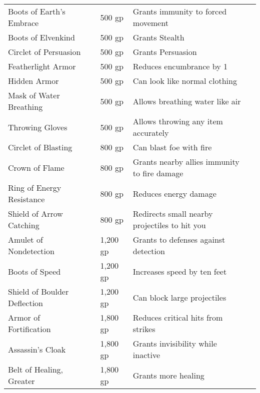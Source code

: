 \begin{longtabuwrapper}
\begin{longtabu}{l l l X l}
Boots of Earth's Embrace &  & 500 gp & Grants immunity to forced movement & \pageref{item:Boots of Earth's Embrace} \\
Boots of Elvenkind &  & 500 gp & Grants  Stealth & \pageref{item:Boots of Elvenkind} \\
Circlet of Persuasion &  & 500 gp & Grants  Persuasion & \pageref{item:Circlet of Persuasion} \\
Featherlight Armor &  & 500 gp & Reduces encumbrance by 1 & \pageref{item:Featherlight Armor} \\
Hidden Armor &  & 500 gp & Can look like normal clothing & \pageref{item:Hidden Armor} \\
Mask of Water Breathing &  & 500 gp & Allows breathing water like air & \pageref{item:Mask of Water Breathing} \\
Throwing Gloves &  & 500 gp & Allows throwing any item accurately & \pageref{item:Throwing Gloves} \\
Circlet of Blasting &  & 800 gp & Can blast foe with fire & \pageref{item:Circlet of Blasting} \\
Crown of Flame &  & 800 gp & Grants nearby allies immunity to fire damage & \pageref{item:Crown of Flame} \\
Ring of Energy Resistance &  & 800 gp & Reduces energy damage & \pageref{item:Ring of Energy Resistance} \\
Shield of Arrow Catching &  & 800 gp & Redirects small nearby projectiles to hit you & \pageref{item:Shield of Arrow Catching} \\
Amulet of Nondetection &  & 1,200 gp & Grants  to defenses against detection & \pageref{item:Amulet of Nondetection} \\
Boots of Speed &  & 1,200 gp & Increases speed by ten feet & \pageref{item:Boots of Speed} \\
Shield of Boulder Deflection &  & 1,200 gp & Can block large projectiles & \pageref{item:Shield of Boulder Deflection} \\
Armor of Fortification &  & 1,800 gp & Reduces critical hits from strikes & \pageref{item:Armor of Fortification} \\
Assassin's Cloak &  & 1,800 gp & Grants invisibility while inactive & \pageref{item:Assassin's Cloak} \\
Belt of Healing, Greater &  & 1,800 gp & Grants more healing & \pageref{item:Belt of Healing, Greater} \\

\end{longtabu}
\end{longtabuwrapper}
